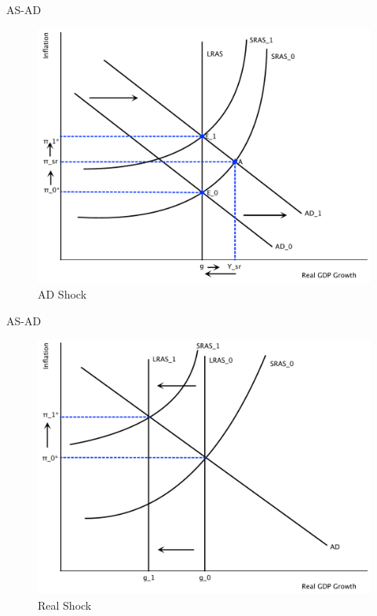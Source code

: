 \documentclass[xcolor={dvipsnames},pdf, hyperref={colorlinks=true, citecolor=ForestGreen, linkcolor=BlueViolet, urlcolor=Magenta}]{beamer}
\theoremstyle{definition}
\begin{document}
\begin{frame}{AS-AD}



\begin{figure}
	\centering
		\includegraphics[scale=.35]{plot99.pdf}
		\caption{AD Shock}

\end{figure}

\end{frame}

\begin{frame}{AS-AD}
\begin{figure}
	\centering
	\includegraphics[scale=.35]{plot100.pdf}
	\caption{Real Shock}
\end{figure}
\end{frame}
\end{document}
